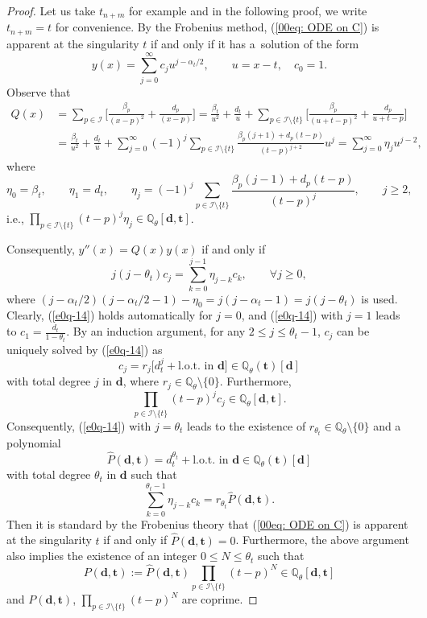 \documentclass[10pt,a4paper]{amsart}
\numberwithin{equation}{section}
\def\Q{\mathbb Q}
\begin{document}
\begin{proof} Let us take $t_{n+m}$ for example and in the following proof, we write $t_{n+m}=t$ for convenience. By the Frobenius method, (\ref{00eq: ODE on C}) is apparent at the singularity $t$ if and only if it has a~solution of the form
\[y(x)=\sum_{j=0}^{\infty}c_j u^{j-\alpha_{t}/2},\qquad u=x-t,\quad c_0=1.\]
Observe that
{\allowdisplaybreaks
\begin{align*}
Q(x)&=\sum_{p\in\mathcal{I}}\biggl[\frac{\beta_p}{(x-p)^2}+\frac{d_p}{(x-p)}\biggr]
=
\frac{\beta_t}{u^2}+\frac{d_t}{u}
+\sum_{p\in\mathcal{I}\setminus\{t\}}
\biggl[\frac{\beta_p}{(u+t-p)^2}+\frac{d_p}{u+t-p}\biggr]\\
&=\frac{\beta_t}{u^2}+\frac{d_t}{u}
+\sum_{j=0}^\infty(-1)^{j} \sum_{p\in\mathcal{I}\setminus\{t\}}\frac{\beta_p(j+1)+d_p(t-p)}{(t-p)^{j+2}}u^j
=\sum_{j=0}^{\infty}\eta_j u^{j-2},
\end{align*}
}%
where
\[\eta_0=\beta_t,\qquad \eta_1=d_t,\qquad
 \eta_j=(-1)^{j} \sum_{p\in\mathcal{I}\setminus\{t\}}\frac{\beta_p(j-1)+d_p(t-p)}{(t-p)^{j}},\qquad j\geq 2,
 \]
i.e., $\prod_{p\in\mathcal{I}\setminus\{t\}}(t-p)^j\eta_j\in \Q_\theta[\boldsymbol d,\boldsymbol t]$.

Consequently, $y''(x)=Q(x)y(x)$ if and only if
\begin{equation}\label{e0q-14}
j(j-\theta_t)c_j=\sum_{k=0}^{j-1}\eta_{j-k}c_k,\qquad\forall j\geq 0,
\end{equation}
where $(j-\alpha_t/2)(j-\alpha_t/2-1)-\eta_0=j(j-\alpha_t-1)=j(j-\theta_t)$ is used. Clearly, (\ref{e0q-14}) holds automatically for $j=0$, and (\ref{e0q-14}) with $j=1$ leads to $c_1=\frac{d_t}{1-\theta_t}$. By an induction argument, for any $2\leq j\leq \theta_t-1$, $c_j$ can be uniquely solved by (\ref{e0q-14}) as
\[c_j=r_j\bigl[d_{t}^j+\text{l.o.t. in $\boldsymbol d$}\bigr]\in \Q_\theta(\boldsymbol t)[\boldsymbol d]\]
with total degree $j$ in $\boldsymbol d$,
where $r_j\in\Q_\theta\setminus\{0\}$. Furthermore,
\[\prod_{p\in\mathcal{I}\setminus\{t\}}(t-p)^j c_j\in \Q_\theta[\boldsymbol d,\boldsymbol t].\]
Consequently, (\ref{e0q-14}) with $j=\theta_t$ leads to the existence of $r_{\theta_t}\in\Q_\theta\setminus\{0\}$ and a polynomial
\[\hat{P}(\boldsymbol d, \boldsymbol t)=d_t^{\theta_t}+\text{l.o.t.\ in $\boldsymbol d$}\in \Q_\theta(\boldsymbol t)[\boldsymbol d]\]
with total degree $\theta_t$ in $\boldsymbol d$ such that
\[
 \sum_{k=0}^{\theta_t-1}\eta_{j-k}c_k=r_{\theta_t}
 \hat{P}(\boldsymbol d, \boldsymbol t).
\]
Then it is standard by the Frobenius theory that (\ref{00eq: ODE on
 C}) is apparent at the singularity $t$ if and only if
$\hat{P}(\boldsymbol d, \boldsymbol t)=0$.
Furthermore, the above argument also implies the existence of an integer $0\leq N\leq \theta_t$ such that
\[
 P(\boldsymbol d, \boldsymbol t):=\hat{P}(\boldsymbol d, \boldsymbol
 t)\prod_{p\in\mathcal{I}\setminus\{t\}}(t-p)^{N}\in
 \Q_\theta[\boldsymbol d,\boldsymbol t]
\]
and $P(\boldsymbol d, \boldsymbol t)$, $\prod_{p\in\mathcal{I}\setminus\{t\}}(t-p)^{N}$ are coprime.
\end{proof}
\end{document}
